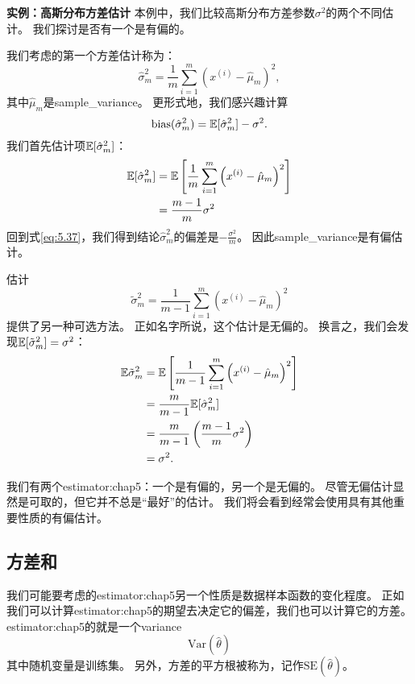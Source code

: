 
\textbf{实例：高斯分布方差估计}\quad 
本例中，我们比较高斯分布方差参数$\sigma^2$的两个不同估计。
我们探讨是否有一个是有偏的。

我们考虑的第一个方差估计称为：
\begin{equation}
    \hat{\sigma}_m^2 = \frac{1}{m} \sum_{i=1}^m \left( x^{(i)} - \hat{\mu}_m \right)^2,
\end{equation}
其中$\hat{\mu}_m$是\gls{sample_variance}。
更形式地，我们感兴趣计算
\begin{equation}
\label{eq:5.37}
    \text{bias} (\hat{\sigma}_m^2) = \mathbb{E} [ \hat{\sigma}_m^2 ]  - \sigma^2.
\end{equation}
我们首先估计项$\mathbb{E} [ \hat{\sigma}_m^2 ]$：
\begin{align}
    \mathbb{E} [ \hat{\sigma}_m^2 ]  &= \mathbb{E} \left[ \frac{1}{m} \sum_{i=1}^m \left( x^{(i)} - \hat{\mu}_m \right)^2  \right] \\
    &= \frac{m-1}{m} \sigma^2
\end{align}
回到式\ref{eq:5.37}，我们得到结论$\hat{\sigma}^2_m$的偏差是$-\frac{\sigma^2}{m}$。
因此\gls{sample_variance}是有偏估计。

 估计
\begin{equation}
    \tilde{\sigma}_m^2 = \frac{1}{m-1} \sum_{i=1}^m \left( x^{(i)} - \hat{\mu}_m \right)^2
\end{equation}
提供了另一种可选方法。
正如名字所说，这个估计是无偏的。
换言之，我们会发现$\mathbb{E}[\tilde{\sigma}_m^2] = \sigma^2$：
\begin{align}
    \mathbb{E}{\tilde{\sigma}_m^2} &= \mathbb{E} \left[ \frac{1}{m-1} \sum_{i=1}^m \left( x^{(i)} - \hat{\mu}_m \right)^2 \right] \\
        &= \frac{m}{m-1} \mathbb{E}[ \hat{\sigma}_m^2 ]  \\
        &= \frac{m}{m-1} \left( \frac{m-1}{m} \sigma^2 \right) \\
        &= \sigma^2.
\end{align}


我们有两个\gls{estimator:chap5}：一个是有偏的，另一个是无偏的。
尽管无偏估计显然是可取的，但它并不总是“最好”的估计。
我们将会看到经常会使用具有其他重要性质的有偏估计。

\subsection{方差和}
\label{sec:variance_and_standard_error}
我们可能要考虑的\gls{estimator:chap5}另一个性质是数据样本函数的变化程度。
正如我们可以计算\gls{estimator:chap5}的期望去决定它的偏差，我们也可以计算它的方差。
\gls{estimator:chap5}的就是一个\gls{variance}
\begin{equation}
    \text{Var}(\hat{\theta})
\end{equation}
其中随机变量是训练集。
另外，方差的平方根被称为，记作$\text{SE}(\hat{\theta})$。

